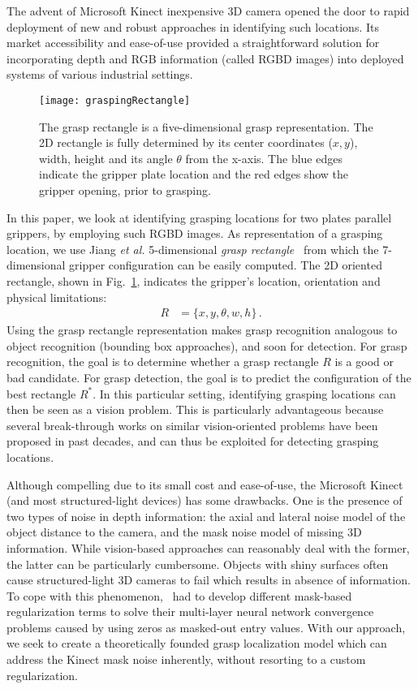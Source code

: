 \documentclass[svgnames]{scrartcl}
\begin{document}
The advent of Microsoft Kinect inexpensive 3D camera opened the door to rapid deployment of new and robust approaches in identifying such locations. Its market accessibility and ease-of-use provided a straightforward solution for incorporating depth and RGB information (called RGBD images) into deployed systems of various industrial settings.

\begin{figure}[t]
\centering
\texttt{[image: graspingRectangle]}
\caption{The grasp rectangle is a five-dimensional grasp representation. The 2D rectangle is fully determined by its center coordinates ($x,y$), width, height and its angle $\theta$ from the x-axis. The blue edges indicate the gripper plate location and the red edges show the gripper opening, prior to grasping.}
\label{fig:grasping_rectangle}
\end{figure}

In this paper, we look at identifying grasping locations for two plates parallel grippers, by employing such RGBD images. As representation of a grasping location, we use Jiang \textit{et al.} 5-dimensional \textit{grasp rectangle}~\citep{jiang2011efficient} from which the 7-dimensional gripper configuration can be easily computed. The 2D oriented rectangle, shown in Fig.~\ref{fig:grasping_rectangle}, indicates the gripper's location, orientation and physical limitations:
\begin{align*}
R &= \{x,y,\theta, w,h\} \, .
\end{align*}
Using the grasp rectangle representation makes grasp recognition analogous to object recognition (bounding box approaches), and soon for detection. For grasp recognition, the goal is to determine whether a grasp rectangle $R$ is a good or bad candidate. For grasp detection, the goal is to predict the configuration of the best rectangle $R^*$. In this particular setting, identifying grasping locations can then be seen as a vision problem. This is particularly advantageous because several break-through works on similar vision-oriented problems have been proposed in past decades, and can thus be exploited for detecting grasping locations.


Although compelling due to its small cost and ease-of-use, the Microsoft Kinect (and most structured-light devices) has some drawbacks. One is the presence of two types of noise in depth information: the axial and lateral noise model of the object distance to the camera, and the mask noise model of missing 3D information. While vision-based approaches can reasonably deal with the former, the latter can be particularly cumbersome. Objects with shiny surfaces often cause structured-light 3D cameras to fail which results in absence of information. To cope with this phenomenon,~\citet{lenz2015deep} had to develop different mask-based regularization terms to solve their multi-layer neural network convergence problems caused by using zeros as masked-out entry values. With our approach, we seek to create a theoretically founded grasp localization model which can address the Kinect mask noise inherently, without resorting to a custom regularization.
\end{document}
